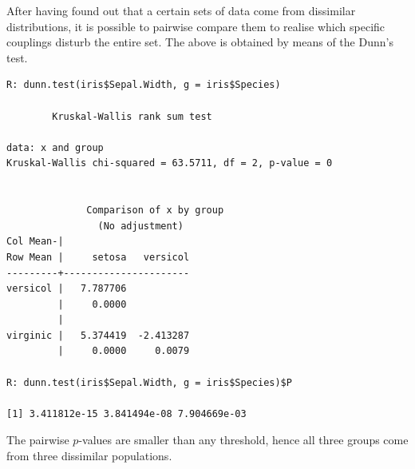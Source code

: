 After having found out that a certain sets of data
come from dissimilar distributions, it is
possible to pairwise compare them to realise
which specific couplings disturb the entire set.
The above is obtained by means of the Dunn's test.
\begin{verbatim}
R: dunn.test(iris$Sepal.Width, g = iris$Species)

        Kruskal-Wallis rank sum test

data: x and group
Kruskal-Wallis chi-squared = 63.5711, df = 2, p-value = 0


              Comparison of x by group                            
                (No adjustment)                                
Col Mean-|
Row Mean |     setosa   versicol
---------+----------------------
versicol |   7.787706
         |     0.0000
         |
virginic |   5.374419  -2.413287
         |     0.0000     0.0079

R: dunn.test(iris$Sepal.Width, g = iris$Species)$P

[1] 3.411812e-15 3.841494e-08 7.904669e-03
\end{verbatim}
The pairwise $p$-values are smaller than any 
threshold, hence all three groups come from
three dissimilar populations.





